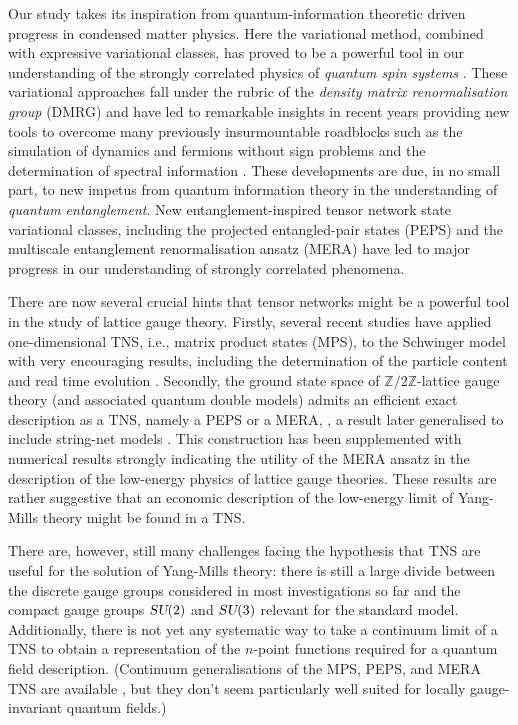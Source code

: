 \documentclass[twocolumn,lengthcheck,superscriptaddress]{revtex4-1}
\def\su2{\textsl{SU}(2)}
\theoremstyle{definition}
\theoremstyle{remark}
\begin{document}
Our study takes its inspiration from quantum-information theoretic driven progress in condensed matter physics. Here the variational method, combined with expressive variational classes, has proved to be a powerful tool in our understanding of the strongly correlated physics of \emph{quantum spin systems} \cite{auerbach:1994a, sachdev:2011a}. These variational approaches fall under the rubric of the \emph{density matrix renormalisation group} (DMRG) \cite{schollwoeck:2005a,schollwock:2011a} and have led to remarkable insights in recent years providing new tools to overcome many previously insurmountable roadblocks such as the simulation of dynamics \cite{vidal:2003a, haegeman:2011b} and fermions \cite{corboz:2009a, corboz:2010a, corboz:2010b, kraus:2010a} without sign problems and the determination of spectral information \cite{haegeman:2012a}. These developments are due, in no small part, to new impetus from quantum information theory in the understanding of \emph{quantum entanglement}. New entanglement-inspired tensor network state variational classes, including the projected entangled-pair states (PEPS) \cite{verstraete:2004a} and the multiscale entanglement renormalisation ansatz (MERA) \cite{vidal:2006a, vidal:2007a} have led to major progress in our understanding of strongly correlated phenomena.

There are now several crucial hints that tensor networks might be a powerful tool in the study of lattice gauge theory. Firstly, several recent studies have applied one-dimensional TNS, i.e., matrix product states (MPS), to the Schwinger model with very encouraging results, including the determination of the particle content and real time evolution \cite{byrnes:2002a,sugihara:2005a,banuls:2013b,banuls:2013a,buyens:2014,buyens:2015dkc,rico:2014,kuhn:2015}. Secondly, the ground state space of $\mathbb{Z}/2\mathbb{Z}$-lattice gauge theory (and associated quantum double models) admits an efficient exact description as a TNS, namely a PEPS or a MERA, \cite{dennis:2002a, aguado:2008a}, a result later generalised to include string-net models \cite{buerschaper:2009a, koenig:2009a}. This construction has been supplemented with numerical results \cite{tagliacozzo:2011a} strongly indicating the utility of the MERA ansatz in the description of the low-energy physics of lattice gauge theories. These results are rather suggestive that an economic description of the low-energy limit of Yang-Mills theory might be found in a TNS.

There are, however, still many challenges facing the hypothesis that TNS are useful for the solution of Yang-Mills theory: there is still a large divide between the discrete gauge groups considered in most investigations so far and the compact gauge groups $\su2$ and $\textsl{SU}(3)$ relevant for the standard model. Additionally, there is not yet any systematic way to take a continuum limit of a TNS to obtain a representation of the $n$-point  functions required for a quantum field description. (Continuum generalisations of the MPS, PEPS, and MERA TNS are available \cite{haegeman:2011a}, but they don't seem particularly well suited for locally gauge-invariant quantum fields.)
\end{document}
